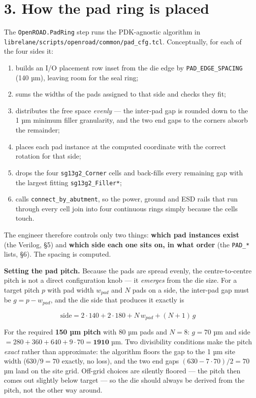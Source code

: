\documentclass[
  11pt,
  a4paper,
]{article}
\providecommand{\tightlist}{%
  \setlength{\itemsep}{0pt}\setlength{\parskip}{0pt}}
\begin{document}
\hypertarget{how-the-pad-ring-is-placed}{%
\section{3. How the pad ring is
placed}\label{how-the-pad-ring-is-placed}}

The \texttt{OpenROAD.PadRing} step runs the PDK-agnostic algorithm in
\texttt{librelane/scripts/openroad/common/pad\_cfg.tcl}. Conceptually,
for each of the four sides it:

\begin{enumerate}
\def\labelenumi{\arabic{enumi}.}
\tightlist
\item
  builds an I/O placement row inset from the die edge by
  \texttt{PAD\_EDGE\_SPACING} (140 µm), leaving room for the seal ring;
\item
  sums the widths of the pads assigned to that side and checks they fit;
\item
  distributes the free space \emph{evenly} --- the inter-pad gap is
  rounded down to the 1 µm minimum filler granularity, and the two end
  gaps to the corners absorb the remainder;
\item
  places each pad instance at the computed coordinate with the correct
  rotation for that side;
\item
  drops the four \texttt{sg13g2\_Corner} cells and back-fills every
  remaining gap with the largest fitting \texttt{sg13g2\_Filler*};
\item
  calls \texttt{connect\_by\_abutment}, so the power, ground and ESD
  rails that run through every cell join into four continuous rings
  simply because the cells touch.
\end{enumerate}

The engineer therefore controls only two things: \textbf{which pad
instances exist} (the Verilog, §5) and \textbf{which side each one sits
on, in what order} (the \texttt{PAD\_*} lists, §6). The spacing is
computed.

\textbf{Setting the pad pitch.} Because the pads are spread evenly, the
centre-to-centre pitch is not a direct configuration knob --- it
\emph{emerges} from the die size. For a target pitch \(p\) with pad
width \(w_{pad}\) and \(N\) pads on a side, the inter-pad gap must be
\(g = p - w_{pad}\), and the die side that produces it exactly is

\[\mathrm{side} = 2\cdot 140 + 2\cdot 180 + N\,w_{pad} + (N{+}1)\,g\]

For the required \textbf{150 µm pitch} with 80 µm pads and \(N = 8\):
\(g = 70\) µm and side
\(= 280 + 360 + 640 + 9 \cdot 70 = \mathbf{1910}\) µm. Two divisibility
conditions make the pitch \emph{exact} rather than approximate: the
algorithm floors the gap to the 1 µm site width (\(630 / 9 = 70\)
exactly, no loss), and the two end gaps \((630 - 7\cdot 70)/2 = 70\) µm
land on the site grid. Off-grid choices are silently floored --- the
pitch then comes out slightly below target --- so the die should always
be derived from the pitch, not the other way around.
\end{document}
